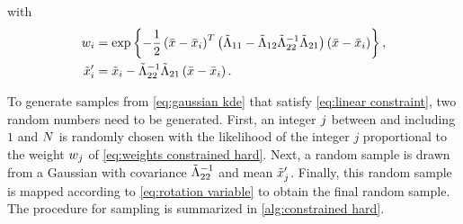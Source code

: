 with
\begin{align}
	\label{eq:weights constrained hard}
	w_{i} &= \exp\left\{  -\frac{1}{2} \left( \bar{x} - \bar{x}_{i} \right)^T
		\left( \tilde{\Lambda}_{11} - \tilde{\Lambda}_{12} \tilde{\Lambda}_{22}^{-1} \tilde{\Lambda}_{21} \right)
		\left( \bar{x} - \bar{x}_{i} \right) \right\}, \\
	\label{eq:offset constrained hard}
	\tilde{x}_{i}' &= \tilde{x}_{i} - \tilde{\Lambda}_{22}^{-1} \tilde{\Lambda}_{21}
	\left( \bar{x} - \bar{x}_{i} \right).
\end{align}

To generate samples from \cref{eq:gaussian kde} that satisfy \cref{eq:linear constraint}, two random numbers need to be generated. 
First, an integer $j$ between and including $1$ and $N$ is randomly chosen with the likelihood of the integer $j$ proportional to the weight $w_{j}$ of \cref{eq:weights constrained hard}. 
Next, a random sample is drawn from a Gaussian with covariance $\tilde{\Lambda}_{22}^{-1}$ and mean $\tilde{x}_{j}'$.
Finally, this random sample is mapped according to \cref{eq:rotation variable} to obtain the final random sample.
The procedure for sampling is summarized in \cref{alg:constrained hard}.

